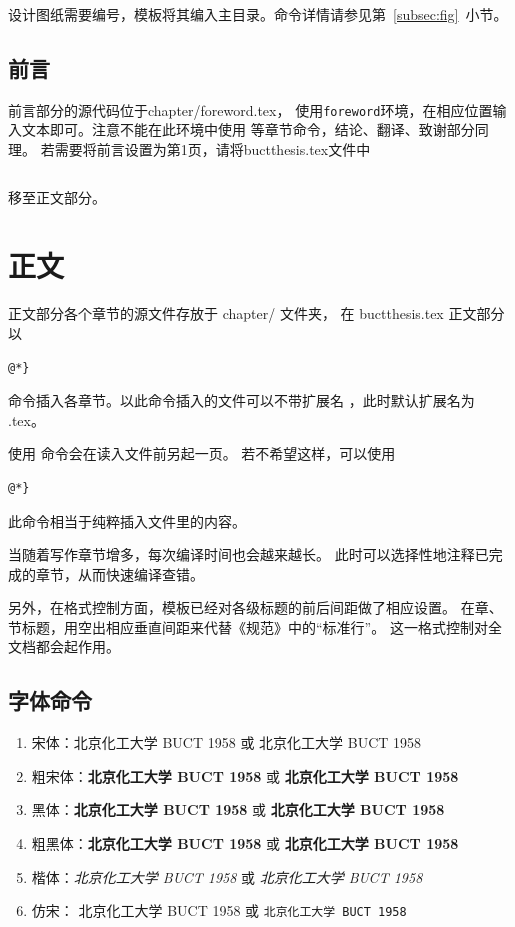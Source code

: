 设计图纸需要编号，模板将其编入主目录。命令详情请参见第~\ref{subsec:fig}~小节。


\subsection{前言}\label{subsec:foreword}
前言部分的源代码位于\textsf{chapter/foreword.tex}，
使用\texttt{foreword}环境，在相应位置输入文本即可。注意不能在此环境中使用
等章节命令，结论、翻译、致谢部分同理。
若需要将前言设置为第1页，请将\textsf{buctthesis.tex}文件中
\begin{lstlisting}[firstnumber=45]

	\end{lstlisting}
移至正文部分。

\section{正文}
正文部分各个章节的源文件存放于 \textsf{chapter/} 文件夹，
在 \textsf{buctthesis.tex} 正文部分以

\begin{lstlisting}[numbers=none]
@*}
	\end{lstlisting}
命令插入各章节。以此命令插入的文件可以不带扩展名
，此时默认扩展名为 \textsf{.tex}。

使用  命令会在读入文件前另起一页。
若不希望这样，可以使用
\begin{lstlisting}[numbers=none]
@*}
	\end{lstlisting}
此命令相当于纯粹插入文件里的内容。

当随着写作章节增多，每次编译时间也会越来越长。
此时可以选择性地注释已完成的章节，从而快速编译查错。

另外，在格式控制方面，模板已经对各级标题的前后间距做了相应设置。
在章、节标题，用空出相应垂直间距来代替《规范》中的“标准行”。
这一格式控制对全文档都会起作用。
\subsection{字体命令}
\begin{enumerate}
	\item 宋体：北京化工大学 BUCT 1958 或 \textrm{北京化工大学 BUCT 1958}
	\item 粗宋体：{\songti\bfseries 北京化工大学 BUCT 1958} 或 \textbf{\songti 北京化工大学 BUCT 1958}
	\item 黑体：{\bfseries 北京化工大学 BUCT 1958} 或 \textbf{北京化工大学 BUCT 1958}
	\item 粗黑体：{\heiti\bfseries 北京化工大学 BUCT 1958} 或 \textbf{\heiti 北京化工大学 BUCT 1958}
	\item 楷体：{\itshape 北京化工大学 BUCT 1958} 或 \textit{北京化工大学 BUCT 1958}
	\item 仿宋： {\ttfamily 北京化工大学 BUCT 1958} 或 \texttt{北京化工大学 BUCT 1958}
\end{enumerate}

